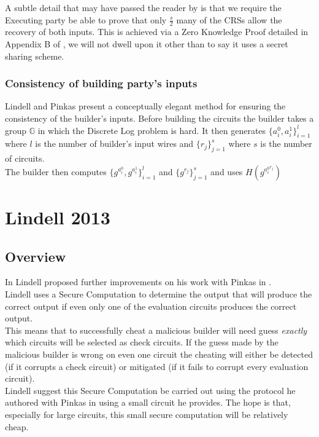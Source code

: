 \documentclass[ %
                    author={Nicholas Tutte},
                supervisor={Prof. Nigel Smart},
                    degree={MEng},
                     title={Secure Two Party Computation},
                  subtitle={A practical comparison of recent protocols},
                      type={Research - GG1K},
                      year={2015} ]{dissertation}
\begin{document}
					A subtle detail that may have passed the reader by is that we require the Executing party be able to prove that only $\frac{s}{2}$ many of the CRSs allow the recovery of both inputs. This is achieved via a Zero Knowledge Proof detailed in Appendix B of \cite{LindellAndPinkas2011}, we will not dwell upon it other than to say it uses a secret sharing scheme.

				\subsubsection{Consistency of building party's inputs}
					Lindell and Pinkas present a conceptually elegant method for ensuring the consistency of the builder's inputs. Before building the circuits the builder takes a group $\mathbb{G}$ in which the Discrete Log problem is hard. It then generates $\{a_i^0, a_i^1\}_{i = 1}^{l}$ where $l$ is the number of builder's input wires and $\{r_j\}_{j = 1}^{s}$ where $s$ is the number of circuits.\\

					The builder then computes $\{g^{a_i^0}, g^{a_i^1}\}_{i = 1}^{l}$ and $\{g^{r_j}\}_{j = 1}^{s}$ and uses $H(g^{a_i^0{^{r_j}}})$

		\section{Lindell 2013}
			\subsection*{Overview}

				In \cite{Lindell_CnC_2013} Lindell proposed further improvements on his work with Pinkas in \cite{LindellAndPinkas2011}.\\

				Lindell uses a Secure Computation to determine the output that will produce the correct output if even only one of the evaluation circuits produces the correct output.\\

				This means that to successfully cheat a malicious builder will need guess \emph{exactly} which circuits will be selected as check circuits. If the guess made by the malicious builder is wrong on even one circuit the cheating will either be detected (if it corrupts a check circuit) or mitigated (if it fails to corrupt every evaluation circuit).\\

				Lindell suggest this Secure Computation be carried out using the protocol he authored with Pinkas in \cite{LindellAndPinkas2011} using a small circuit he provides. The hope is that, especially for large circuits, this small secure computation will be relatively cheap.\\
\end{document}
